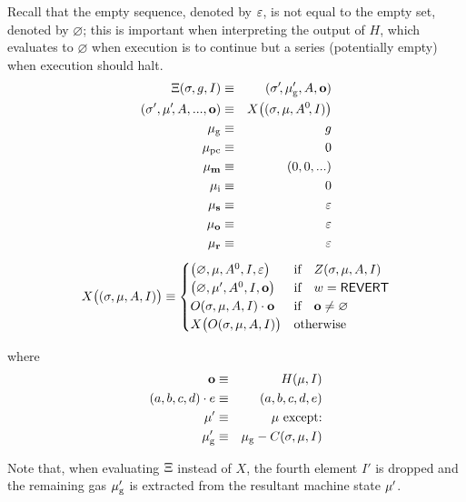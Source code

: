 Recall that the empty sequence, denoted by $\mathbb{\varepsilon}$, is not equal to the empty set, denoted by $\varnothing$; this is important when interpreting the output of $H$, which evaluates to $\varnothing$ when execution is to continue but a series (potentially empty) when execution should halt.
\begin{eqnarray}
\mathrm{\Xi}(\mathbf{\sigma}, g, I) & \equiv & (\mathbf{\sigma}'\!, \mathbf{\mu}'_{\mathrm{g}}, A, \mathbf{o}) \\
(\mathbf{\sigma}', \mathbf{\mu}'\!, A, ..., \mathbf{o}) & \equiv & X\big((\mathbf{\sigma}, \mathbf{\mu}, A^0\!, I)\big) \\
\mathbf{\mu}_{\mathrm{g}} & \equiv & g \\
\mathbf{\mu}_{\mathrm{pc}} & \equiv & 0 \\
\mathbf{\mu}_{\mathbf{m}} & \equiv & (0, 0, ...) \\
\mathbf{\mu}_{\mathrm{i}} & \equiv & 0	\\
\mathbf{\mu}_{\mathbf{s}} & \equiv & \mathbb{\varepsilon} \\
\mathbf{\mu}_{\mathbf{o}} & \equiv & \mathbb{\varepsilon}	\\
\mathbf{\mu}_{\mathbf{r}} & \equiv & \mathbb{\varepsilon}
\end{eqnarray}
\begin{equation} \label{eq:X-def}
X\big( (\mathbf{\sigma}, \mathbf{\mu}, A, I) \big) \equiv \begin{cases}
\big(\varnothing, \mathbf{\mu}, A^0, I, \mathbb{\varepsilon}\big) & \text{if} \quad Z(\mathbf{\sigma}, \mathbf{\mu}, A, I) \\
\big(\varnothing, \mathbf{\mu}', A^0, I, \mathbf{o}\big) & \text{if} \quad w =  \mathsf{REVERT} \\
O(\mathbf{\sigma}, \mathbf{\mu}, A, I) \cdot \mathbf{o} & \text{if} \quad \mathbf{o} \neq \varnothing \\
X\big(O(\mathbf{\sigma}, \mathbf{\mu}, A, I)\big) & \text{otherwise} \\
\end{cases}
\end{equation}

where
\begin{eqnarray}
\mathbf{o} & \equiv & H(\mathbf{\mu}, I) \\
(a, b, c, d) \cdot e & \equiv & (a, b, c, d, e) \\
\mathbf{\mu}' & \equiv & \mathbf{\mu}\ \text{except:} \\
\mathbf{\mu}'_{\mathrm{g}} & \equiv & \mathbf{\mu}_{\mathrm{g}} - C(\mathbf{\sigma}, \mathbf{\mu}, I)
\end{eqnarray}

Note that, when evaluating $\mathrm{\Xi}$ instead of $X$, 
the fourth element $I'$ is dropped and the remaining gas $\mathbf{\mu}'_{\mathrm{g}}$ is extracted from the resultant machine state $\mathbf{\mu}'$.

